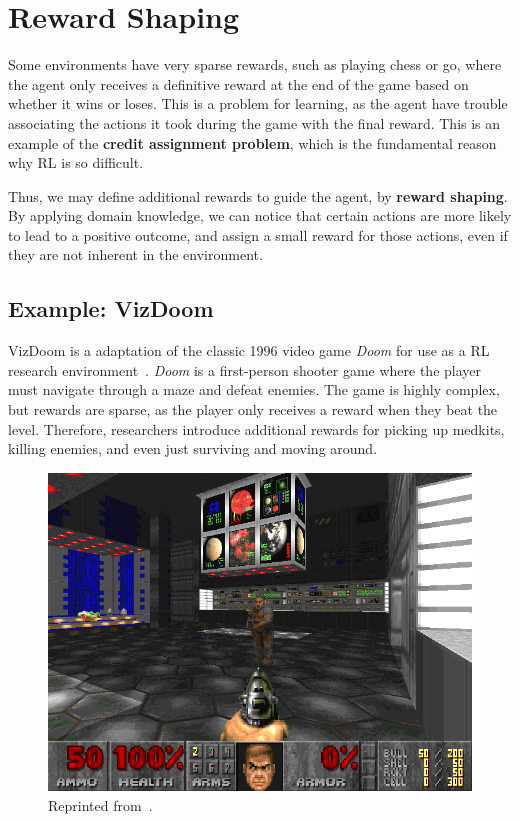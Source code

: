 \documentclass[12pt]{report}
\theoremstyle{definition}
\theoremstyle{remark}
\begin{document}
\section{Reward Shaping}
Some environments have very sparse rewards, such as playing chess or go, where the agent only receives a definitive reward at the end of the game based on whether it wins or loses. This is a problem for learning, as the agent have trouble associating the actions it took during the game with the final reward. This is an example of the \textbf{credit assignment problem}, which is the fundamental reason why RL is so difficult.

Thus, we may define additional rewards to guide the agent, by \textbf{reward shaping}. By applying domain knowledge, we can notice that certain actions are more likely to lead to a positive outcome, and assign a small reward for those actions, even if they are not inherent in the environment.

\subsection{Example: VizDoom}

VizDoom is a adaptation of the classic 1996 video game \textit{Doom} for use as a RL research environment~\cite{kempka_vizdoom_2016}. \textit{Doom} is a first-person shooter game where the player must navigate through a maze and defeat enemies. The game is highly complex, but rewards are sparse, as the player only receives a reward when they beat the level. Therefore, researchers introduce additional rewards for picking up medkits, killing enemies, and even just surviving and moving around.

\begin{figure}[h]
    \centering
    \includegraphics[width=0.5\linewidth]{figs/doom.png}
    \caption{Reprinted from~\cite{kempka_vizdoom_2016}.}
    \label{fig:enter-label}
\end{figure}
\end{document}
